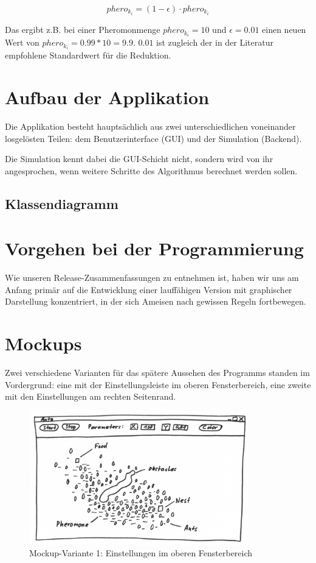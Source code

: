 \[ phero_{k_i} = (1 - \epsilon) \cdot phero_{k_i} \]

Das ergibt z.B. bei einer Pheromonmenge $phero_{k_i} = 10$ und $\epsilon = 0.01$ einen neuen Wert von $phero_{k_i} = 0.99 * 10 = 9.9$. $0.01$ ist zugleich der in der Literatur empfohlene Standardwert für die Reduktion.

\section{Aufbau der Applikation}

Die Applikation besteht hauptsächlich aus zwei unterschiedlichen voneinander losgelösten Teilen: dem Benutzerinterface (GUI) und der Simulation (Backend).

Die Simulation kennt dabei die GUI-Schicht nicht, sondern wird von ihr angesprochen, wenn weitere Schritte des Algorithmus berechnet werden sollen.

\subsection{Klassendiagramm}



\section{Vorgehen bei der Programmierung}

Wie unseren Release-Zusammenfassungen zu entnehmen ist, haben wir uns am Anfang primär auf die Entwicklung einer lauffähigen Version mit graphischer Darstellung konzentriert, in der sich Ameisen nach gewissen Regeln fortbewegen. 

\section{Mockups}

Zwei verschiedene Varianten für das spätere Aussehen des Programms standen im Vordergrund: eine mit der Einstellungsleiste im oberen Fensterbereich, eine zweite mit den Einstellungen am rechten Seitenrand.

\begin{figure}[h]
  \centering
	\includegraphics [width=0.85\textwidth]{images/Antz_Mockup_1_sw.png} 
	\caption{Mockup-Variante 1: Einstellungen im oberen Fensterbereich}
\end{figure}

